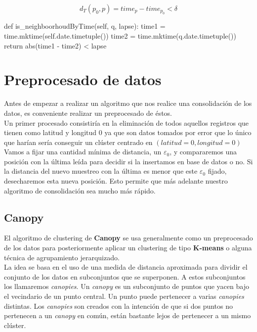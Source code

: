 \documentclass[a4paper, 12pt]{article}
\begin{document}
$$ d_T(p_0, p) = time_p - time_{p_0} < \delta $$

\begin{python}
	def is_neighboorhoudByTime(self, q, lapse):
		time1 = time.mktime(self.date.timetuple())
		time2 = time.mktime(q.date.timetuple())
		return abs(time1 - time2) < lapse
\end{python}


\pagebreak
\section{Preprocesado de datos}
Antes de empezar a realizar un algoritmo que nos realice una consolidaci\'on de los datos, es conveniente realizar un preprocesado de \'estos. \\

Un primer procesado consistir\'ia en la eliminaci\'on de todos aquellos registros que tienen como latitud y longitud $0$ ya que son datos tomados por error que lo \'unico que har\'ian ser\'ia conseguir un cl\'uster centrado en $(latitud = 0, longitud = 0)$ \\

Vamos a fijar una cantidad m\'inima de distancia, un $\varepsilon_0$, y compararemos una posici\'on con la \'ultima le\'ida para decidir si la insertamos en base de datos o no. Si la distancia del nuevo muestreo con la \'ultima es menor que este $\varepsilon_0$ fijado, desecharemos esta nueva posici\'on. Esto permite que m\'as adelante nuestro algoritmo de consolidaci\'on sea mucho m\'as r\'apido. \\


\subsection{Canopy}\label{sec:canopy}

El algoritmo de clustering de \textbf{Canopy} se usa generalmente como un preprocesado de los datos para posteriormente aplicar un clustering de tipo \textbf{K-means} o alguna t\'ecnica de agrupamiento jerarquizado.\\

La idea se basa en el uso de una medida de distancia aproximada para dividir el conjunto de los datos en subconjuntos que se superponen. A estos subconjuntos los llamaremos \textit{canopies}. Un \textit{canopy} es un subconjunto de puntos que yacen bajo el vecindario de un punto central. Un punto puede pertenecer a varias \textit{canopies} distintas. Los \textit{canopies} son creados con la intenci\'on de que si dos puntos no pertenecen a un \textit{canopy} en com\'un, est\'an bastante lejos de pertenecer a un mismo cl\'uster. \\
\end{document}

